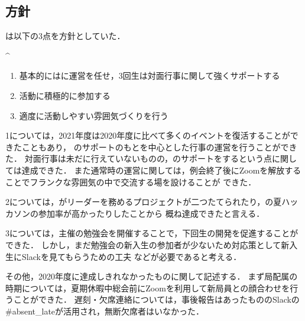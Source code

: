 \subsection*{\newGradeIfKouki{}\thirdGrade{}方針}


\thirdGrade{}は以下の3点を方針としていた．

^\begin{enumerate}
    \item 基本的には\secondGrade{}に運営を任せ，3回生は対面行事に関して強くサポートする
    \item 活動に積極的に参加する
    \item 適度に活動しやすい雰囲気づくりを行う
\end{enumerate}


1については，2021年度は2020年度に比べて多くのイベントを復活することができたこともあり，
\thirdGrade{}のサポートのもと\secondGrade{}を中心とした行事の運営を行うことができた．
対面行事は未だに行えていないものの，\secondGrade{}のサポートをするという点に関しては達成できた．
また通常時の運営に関しては，例会終了後にZoomを解放することでフランクな雰囲気の中で交流する場を設けることが
できた．

2については，\thirdGrade{}がリーダーを務めるプロジェクトが二つたてられたり，\thirdGrade{}の夏ハッカソンの参加率が高かったりしたことから
概ね達成できたと言える．

3については，\thirdGrade{}主催の勉強会を開催することで，下回生の開発を促進することができた．
しかし，まだ勉強会の新入生の参加者が少ないため対応策として新入生にSlackを見てもらうための工夫
などが必要であると考える．

その他，2020年度に達成しきれなかったものに関して記述する．
まず局配属の時期については，夏期休暇中総会前にZoomを利用して新局員との顔合わせを行うことができた．
遅刻・欠席連絡については，事後報告はあったもののSlackの#absent_lateが活用され，無断欠席者はいなかった．

